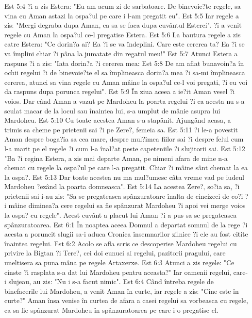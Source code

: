 Est 5:4  ?i a zis Estera: "Eu am acum zi de sarbatoare. De binevoie?te regele, sa vina cu Aman astazi la ospa?ul pe care i l-am pregatit eu".
Est 5:5  Iar regele a zis: "Mergi degraba dupa Aman, ca sa se faca dupa cuvântul Esterei". ?i a venit regele cu Aman la ospa?ul ce-l pregatise Estera.
Est 5:6  La bautura regele a zis catre Estera: "Ce dorin?a ai? Ea ?i se va îndeplini. Care este cererea ta? Ea ?i se va împlini chiar ?i pâna la jumatate din regatul meu!"
Est 5:7  Atunci Estera a raspuns ?i a zis: "Iata dorin?a ?i cererea mea:
Est 5:8  De am aflat bunavoin?a în ochii regelui ?i de binevoie?te el sa împlineasca dorin?a mea ?i sa-mi împlineasca cererea, atunci sa vina regele cu Aman mâine la ospa?ul ce-l voi pregati, ?i eu voi da raspuns dupa porunca regelui".
Est 5:9  În ziua aceea a ie?it Aman vesel ?i voios. Dar când Aman a vazut pe Mardoheu la poarta regelui ?i ca acesta nu s-a sculat macar de la locul sau înaintea lui, s-a umplut de mânie asupra lui Mardoheu.
Est 5:10  Cu toate acestea Aman s-a stapânit. Ajungând acasa, a trimis sa cheme pe prietenii sai ?i pe Zere?, femeia sa.
Est 5:11  ?i le-a povestit Aman despre boga?ia sa cea mare, despre mul?imea fiilor sai ?i despre felul cum l-a marit pe el regele ?i cum l-a înal?at peste capeteniile ?i slujitorii sai.
Est 5:12  "Ba ?i regina Estera, a zis mai departe Aman, pe nimeni afara de mine n-a chemat cu regele la ospa?ul pe care l-a pregatit. Chiar ?i mâine sânt chemat la ea la ospa?.
Est 5:13  Dar toate acestea nu ma mul?umesc câta vreme vad pe iudeul Mardoheu ?ezând la poarta domneasca".
Est 5:14  La acestea Zere?, so?ia sa, ?i prietenii sai i-au zis: "Sa se pregateasca spânzuratoare înalta de cincizeci de co?i ?i mâine diminea?a cere regelui sa fie spânzurat Mardoheu ?i apoi vei merge voios la ospa? cu regele". Acest cuvânt a placut lui Aman ?i a pus sa se pregateasca spânzuratoarea.
Est 6:1  În noaptea aceea Domnul a departat somnul de la rege ?i acesta a poruncit slugii sa-i aduca Cronica însemnarilor zilnice ?i ele au fost citite înaintea regelui.
Est 6:2  Acolo se afla scris ce descoperise Mardoheu regelui cu privire la Bigtan ?i Tere?, cei doi eunuci ai regelui, pazitorii pragului, care uneltisera sa puna mâna pe regele Artaxerxe.
Est 6:3  Atunci a zis regele: "Ce cinste ?i rasplata s-a dat lui Mardoheu pentru aceasta?" Iar oamenii regelui, care-i slujeau, au zis: "Nu i s-a facut nimic".
Est 6:4  Când întreba regele de binefacerile lui Mardoheu, a venit Aman în curte, iar regele a zis: "Cine este în curte?" Aman însa venise în curtea de afara a casei regelui sa vorbeasca cu regele, ca sa fie spânzurat Mardoheu în spânzuratoarea pe care i-o pregatise el.
